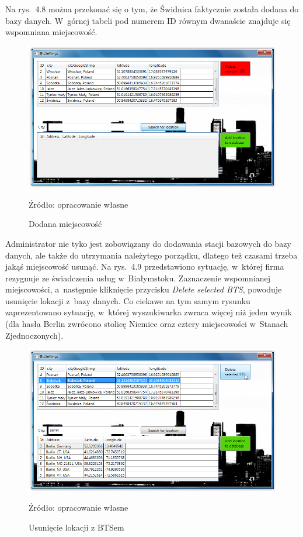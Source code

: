 \documentclass[12pt,a4paper]{report}
\begin{document}
Na rys.~4.8 można przekonać się o tym, że Świdnica faktycznie została dodana do bazy danych. W~górnej tabeli pod numerem ID równym dwanaście znajduje się wspomniana miejscowość.

\begin{figure}[!bht]
\centering
\includegraphics[scale=0.5]{Pictures/AddedCity.png}
\label{fig: AddedCity}
\caption{Dodana miejscowość}{Źródło: opracowanie własne}
\end{figure}
\newpage
Administrator nie tyko jest zobowiązany do dodawania stacji bazowych do bazy danych, ale także do utrzymania należytego porządku, dlatego też czasami trzeba jakąś miejscowość usunąć. Na rys.~4.9 przedstawiono sytuację, w~której firma rezygnuje ze świadczenia usług w~Białymstoku. Zaznaczenie wspomnianej miejscowości, a~następnie kliknięcie przycisku \textit{Delete selected BTS}, powoduje usunięcie lokacji z~bazy danych. Co ciekawe na tym samym rysunku zaprezentowano sytuację, w~której wyszukiwarka zwraca więcej niż jeden wynik (dla hasła Berlin zwrócono stolicę Niemiec oraz cztery miejscowości w~Stanach Zjednoczonych).

\begin{figure}[!bht]
\centering
\includegraphics[scale=0.5]{Pictures/DeleteBTE.png}
\label{fig: DeleteBTS}
\caption{Usunięcie lokacji z BTSem}{Źródło: opracowanie własne}
\end{figure}
\end{document}

